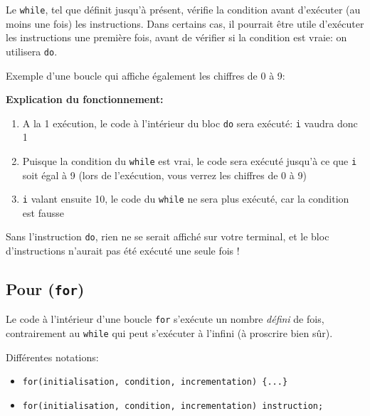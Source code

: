 				\begin{remarque}
					Le \lstinline|while|, tel que définit jusqu'à présent, vérifie la condition avant d'exécuter (au moins une fois) les instructions. Dans certains cas, il pourrait être utile d'exécuter les instructions une première fois, avant de vérifier si la condition est vraie: on utilisera \lstinline|do|.
				\end{remarque}
			
				\begin{exemple}
					Exemple d'une boucle qui affiche également les chiffres de \num{0} à \num{9}:
					
				\end{exemple}
				
				\textbf{Explication du fonctionnement:}
					\begin{enumerate}
						\item A la 1\iere{} exécution, le code à l'intérieur du bloc \lstinline|do| sera exécuté: \lstinline|i| vaudra donc \num{1}
						\item Puisque la condition du \lstinline|while| est vrai, le code sera exécuté jusqu'à ce que \lstinline|i| soit égal à 9 (lors de l'exécution, vous verrez les chiffres de 0 à 9)
						\item \lstinline|i| valant ensuite \num{10}, le code du \lstinline|while| ne sera plus exécuté, car la condition est fausse
					\end{enumerate}
				
				\begin{remarque}
					Sans l'instruction \lstinline|do|, rien ne se serait affiché sur votre terminal, et le bloc d'instructions n'aurait pas été exécuté une seule fois !
				\end{remarque}
			
			\subsection{Pour (\lstinline|for|)}
			
				Le code à l'intérieur d'une boucle \lstinline|for| s'exécute un nombre \emph{défini} de fois, contrairement au \lstinline|while| qui peut s'exécuter à l'infini (à proscrire bien sûr).
				
				Différentes notations:
				\begin{itemize}
					\item \lstinline|for(initialisation, condition, incrementation) {...}|
					\item \lstinline|for(initialisation, condition, incrementation) instruction;|
				\end{itemize}
			
